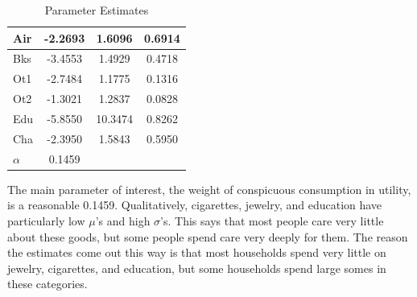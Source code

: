 \documentclass{article}
\begin{document}
\begin{table}
\begin{center}
\begin{tabular}{|l|c|c|c|}
			\hline
			Air & -2.2693 &    1.6096 &    0.6914\\ 
			\hline
			Bks & -3.4553 &    1.4929 &    0.4718\\ 
			\hline
			Ot1 & -2.7484 &    1.1775 &    0.1316\\ 
			\hline
			Ot2 & -1.3021 &    1.2837 &    0.0828\\ 
			\hline
			Edu & -5.8550 &   10.3474 &    0.8262\\ 
			\hline
			Cha & -2.3950 &    1.5843 &    0.5950\\ 
			\hline
		        \hline	
			$\alpha$ & 0.1459 & & \\
			\hline
			\hline
		\end{tabular}
	\end{center}
	\caption{Parameter Estimates}
	\label{tab:parest}
\end{table}
The main parameter of interest, the weight of conspicuous consumption in utility, is a reasonable 0.1459.  
Qualitatively, cigarettes, jewelry, and education have particularly low $\mu$'s and high $\sigma$'s. 
This says that most people care very little about these goods, but some people spend care very deeply for them.
The reason the estimates come out this way is that most households spend very little on jewelry, cigarettes, and education, but some households spend large somes in these categories. 
\end{document}
